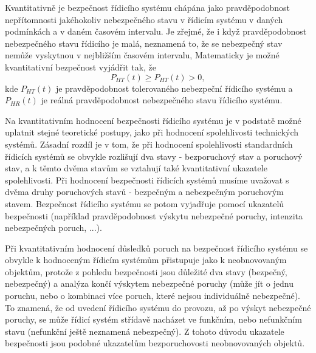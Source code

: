 \begin{center}
    Kvantitativně je bezpečnost řídicího systému chápána jako pravděpodobnost nepřítomnosti
    jakéhokoliv nebezpečného stavu v řídicím systému v daných podmínkách a v daném časovém
    intervalu. Je zřejmé, že i když pravděpodobnost nebezpečného stavu řídicího je malá, neznamená
    to, že se nebezpečný stav nemůže vyskytnou v nejbližším časovém intervalu, Matematicky je možné
    kvantitativní bezpečnost vyjádřit tak, že
    \begin{equation}
      P_{HT}(t)\geq P_{HT}(t)>0,
    \end{equation}
    kde \(P_{HT}(t)\) je pravděpodobnost tolerovaného nebezpeční řídicího systému a \(P_{HR}(t)\)
    je reálná pravděpodobnost nebezpeč\-ného stavu řídicího systému.
	 
    Na kvantitativním hodnocení bezpečnosti řídicího systému je v podstatě možné uplatnit stejné 
    teoretické postupy, jako při hodnocení spolehlivosti technických systémů. Zásadní rozdíl je v 
    tom, že při hodnocení spolehlivosti standardních řídicích systémů se obvykle rozlišují dva 
    stavy - bezporuchový stav a poruchový stav, a k těmto dvěma stavům se vztahují také 
    kvantitativní ukazatele spolehlivosti. Při hodnocení bezpečnosti řídicích systémů musíme 
    uvažovat s dvěma druhy poruchových stavů - bezpečným a nebezpečným poruchovým stavem. 
    Bezpečnost řídicího systému se potom vyjadřuje pomocí ukazatelů bezpečnosti (například 
    pravděpodobnost výskytu nebezpečné poruchy, intenzita nebezpečných poruch, ...).

    Při kvantitativním hodnocení důsledků poruch na bezpečnost řídicího systému se obvykle k 
    hodnoceným řídicím systémům přistupuje jako k neobnovovaným objektům, protože z pohledu 
    bezpečnosti jsou důležité dva stavy (bezpečný, nebezpečný) a analýza končí výskytem nebezpečné 
    poruchy (může jít o jednu poruchu, nebo o kombinaci více poruch, které nejsou individuálně 
    nebezpečné). To znamená, že od uvedení řídicího systému do provozu, až po výskyt nebezpečné 
    poruchy, se může řídicí systém střídavě nacházet ve funkčním, nebo nefunkčním stavu (nefunkční 
    ještě neznamená nebezpečný). Z tohoto důvodu ukazatele bezpečnosti jsou podobné ukazatelům 
    bezporuchovosti neobnovovaných objektů. 
  

\end{center}
